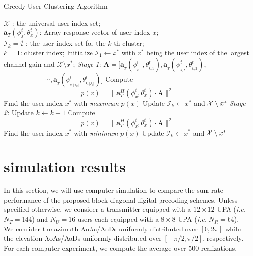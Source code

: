 \documentclass[conference]{IEEEtran}
\begin{document}
{\begin{algorithm}[h] 		
	\caption{Greedy User Clustering Algorithm}
	\label{beam_cluster}
	\begin{algorithmic}
		\REQUIRE  \quad
		\STATE	$\mathcal{X}$ : the universal user index set; \\
		\STATE $\bm{a}_{T}(\phi^t_{x},\theta^t_{x})$: Array response vector of user index $x$;\\
		\STATE  $\mathcal{I}_k=\emptyset$ : the user index set for the $k$-th cluster;\\
		\STATE  $k=1$: cluster index;
		\STATE Initialize $\mathcal{I}_1 \leftarrow  x^*$ with $x^*$ being the user index of the largest channel gain and ${\mathcal X}\setminus x^*$;
		\ENSURE   	
		\STATE  \noindent\textit{Stage 1}:
		\STATE$\bm{{A}}=[\bm{a}_{_T}(\phi^t_{_{k,1}},\theta^t_{_{k,1}}), \bm{a}_{_T}(\phi^t_{_{k,2}},\theta^t_{_{k,2}}\!),$
		\STATE$\qquad \qquad\qquad\cdots,\bm{a}_{_T}(\phi^t_{_{k,|\mathcal{I}_k|}},\theta^t_{_{k,|\mathcal{I}_k|}})]$
		\STATE Compute $$p(x) =  \|\bm{a}^H_{T}(\phi^t_{x},\theta^t_{x})\cdot \bm{A}\|^2$$ 
		\ENDFOR
		\STATE Find the user index $x^*$ with \textit{maximum} $p(x)$
		\STATE Update $\mathcal{I}_{k}\leftarrow  x^*$ and  ${\cal X}\setminus x^*$
		\STATE  \noindent\textit{Stage 2}:
		\STATE Update $k \leftarrow k+1$
		\STATE Compute $$p(x) =  \|\bm{a}^H_{T}(\phi^t_{x},\theta^t_{x})\cdot \bm{A}\|^2$$
		\ENDFOR
		\STATE Find the user index $x^*$ with \textit{minimum} $p(x)$
		\STATE Update $\mathcal{I}_{k}\leftarrow  x^*$ and  ${\cal X}\setminus x^*$
		\ENDIF
		\ENDWHILE
	\end{algorithmic}
\end{algorithm}

\section{simulation results}
In this section, we will use computer simulation to compare the sum-rate performance of the proposed block diagonal digital precoding schemes. Unless specified otherwise, we consider a transmitter equipped with a $12\times 12$ UPA ({\em i.e.} $N_T=144$) and $N_U=16$ users each equipped with a $8\times 8$ UPA ({\em i.e.} $N_R=64$). We consider the azimuth AoAs/AoDs uniformly distributed over $[0, 2\pi]$ while the elevation AoAs/AoDs uniformly distributed over $[-\pi/2, \pi/2]$, respectively. For each computer experiment, we compute the average over 500 realizations.

}
\end{document}
